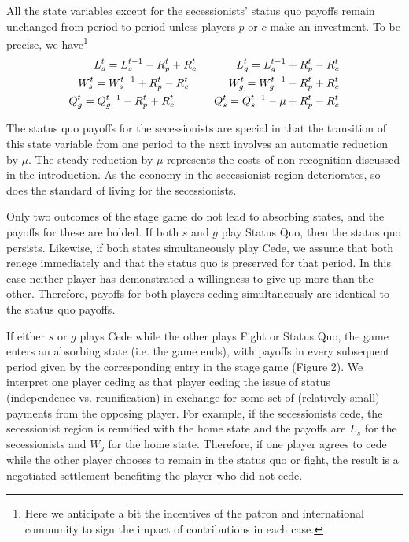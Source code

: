 \documentclass[11pt,letterpaper, notitlepage]{article}
\begin{document}
All the state variables except for the secessionists' status quo payoffs remain unchanged from period to period unless players $p$ or $c$ make an investment. To be precise, we have\footnote{Here we anticipate a bit the incentives of the patron and international community to sign the impact of contributions in each case.}
	\begin{equation}
	\begin{aligned}
		L_s^t = L_s^{t-1} - R_p^t + R_c^t \hskip.5in L_g^t = L_g^{t-1} + R_p^t - R_c^t \\
		W_s^t = W_s^{t-1} + R_p^t - R_c^t \hskip.5in W_g^t = W_g^{t-1} - R_p^t + R_c^t \\
		Q_g^t = Q_g^{t-1} - R_p^t + R_c^t \hskip.5in Q_s^t = Q_s^{t-1} - \mu + R_p^t - R_c^t
		\label{eqn:motion}
	\end{aligned}
	\end{equation}
	

The status quo payoffs for the secessionists are special in that the transition of this state variable from one period to the next involves an automatic reduction by $\mu$. The steady reduction by $\mu$ represents the costs of non-recognition discussed in the introduction. As the economy in the secessionist region deteriorates, so does the standard of living for the secessionists.

Only two outcomes of the stage game do not lead to absorbing states, and the payoffs for these are bolded. If both $s$ and $g$ play Status Quo, then the status quo persists. Likewise, if both states simultaneously play Cede, we assume that both renege immediately and that the status quo is preserved for that period. In this case neither player has demonstrated a willingness to give up more than the other. Therefore, payoffs for both players ceding simultaneously are identical to the status quo payoffs.%

If either $s$ or $g$ plays Cede while the other plays Fight or Status Quo, the game enters an absorbing state (i.e. the game ends), with payoffs in every subsequent period given by the corresponding entry in the stage game (Figure 2). We interpret one player ceding as that player ceding the issue of status (independence vs. reunification) in exchange for some set of (relatively small) payments from the opposing player. For example, if the secessionists cede, the secessionist region is reunified with the home state and the payoffs are $L_s$ for the secessionists and $W_g$ for the home state. Therefore, if one player agrees to cede while the other player chooses to remain in the status quo or fight, the result is a negotiated settlement benefiting the player who did not cede. 
\end{document}
